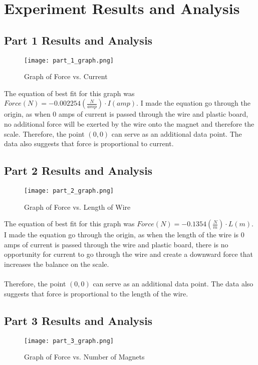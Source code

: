 \documentclass[11pt,twoside]{article}
\begin{document}

\section{Experiment Results and Analysis}

\subsection{Part 1 Results and Analysis}
\begin{wrapfigure}{l}{0.7\textwidth}
    \centering
    \texttt{[image: part\_1\_graph.png]}
    \caption{Graph of Force vs. Current}
\end{wrapfigure}

The equation of best fit for this graph was $Force (N) = -0.002254 (\frac{N}{amp}) \cdot I (amp)$. I made the equation go through the origin, as when $0$ amps of current is passed through the wire and plastic board, no additional force will be exerted by the wire onto the magnet and therefore the scale. Therefore, the point $(0,0)$ can serve as an additional data point. The data also suggests that force is proportional to current.

\subsection{Part 2 Results and Analysis}
\begin{wrapfigure}{l}{0.7\textwidth}
    \centering
    \texttt{[image: part\_2\_graph.png]}
    \caption{Graph of Force vs. Length of Wire}
\end{wrapfigure}

The equation of best fit for this graph was $Force (N) = -0.1354 (\frac{N}{m}) \cdot L (m)$. I made the equation go through the origin, as when the length of the wire is $0$ amps of current is passed through the wire and plastic board, there is no opportunity for current to go through the wire and create a downward force that increases the balance on the scale. \\ \\ Therefore, the point $(0,0)$ can serve as an additional data point. The data also suggests that force is proportional to the length of the wire.

\subsection{Part 3 Results and Analysis}
\begin{wrapfigure}{l}{0.7\textwidth}
    \centering
    \texttt{[image: part\_3\_graph.png]}
    \caption{Graph of Force vs. Number of Magnets}
\end{wrapfigure}
\end{document}
